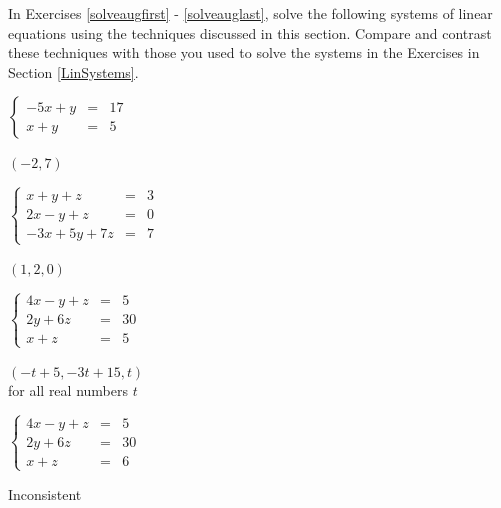 \documentclass{ximera}
\begin{document}
\begin{question}
In Exercises \ref{solveaugfirst} - \ref{solveauglast}, solve the following systems of linear equations using the techniques discussed in this section.  Compare and contrast these techniques with those you used to solve the systems in the Exercises in Section \ref{LinSystems}.

\begin{problem}\label{solveaugfirst}
$\left\{ \begin{array}{rcr} -5x + y & = & 17  \\ x + y & = & 5  \end{array} \right.$ 

\begin{solution}
$(-2, 7)$
\end{solution}
\end{problem}

\begin{problem}
$\left\{ \begin{array}{rcr} x + y + z & = & 3 \\ 2x - y + z & = & 0 \\ -3x + 5y + 7z & = & 7  \end{array} \right.$

\begin{solution}
$(1, 2, 0)$
\end{solution}
\end{problem}

\begin{problem}\label{dependentsystemmuliple}
$\left\{ \begin{array}{rcr} 4x - y + z & = & 5 \\ 2y + 6z & = & 30 \\ x + z & = & 5  \end{array} \right.$

\begin{solution}
$(-t + 5, -3t + 15, t)$\\
for all real numbers $t$
\end{solution}
\end{problem}

\begin{problem}
$\left\{ \begin{array}{rcr} 4x - y + z & = & 5 \\ 2y + 6z & = & 30 \\ x + z & = & 6  \end{array} \right.$

\begin{solution}
Inconsistent
\end{solution}
\end{problem}


\end{question}
\end{document}

